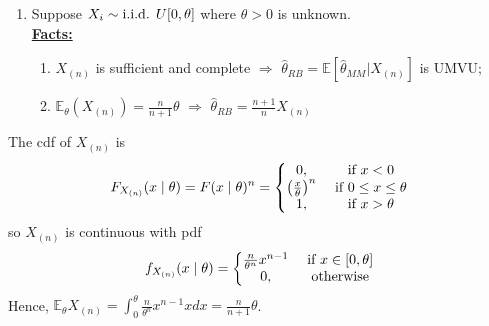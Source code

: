 \documentclass[11pt]{elegantbook}
\begin{document}
\begin{example}\quad
    \begin{enumerate}
        \item Suppose $X_i\sim \textnormal{i.i.d. } U[0,\theta]$ where $\theta>0$ is unknown.\\
        \textbf{\underline{Facts:}}
        \begin{enumerate}[$\bullet$]
            \item $X_{(n)}$ is sufficient and complete $\Rightarrow$
            $\hat{\theta}_{RB}=\mathbb{E}[\hat{\theta}_{MM}|X_{(n)}]$ is UMVU;
            \item $\mathbb{E}_\theta(X_{(n)})=\frac{n}{n+1}\theta$ $\Rightarrow$ $\hat{\theta}_{RB}=\frac{n+1}{n}X_{(n)}$
        \end{enumerate}
    \end{enumerate}
    \begin{remark}
        The cdf of $X_{(n)}$ is
        \begin{equation}
            \begin{aligned}
                F_{X_{(n)}}(x\mid\theta)=F(x\mid\theta)^n=\left\{\begin{matrix}
                    0,&\textnormal{ if }x<0\\
                    \left(\frac{x}{\theta}\right)^n&\textnormal{ if }0\leq x\leq \theta\\
                    1,&\textnormal{ if }x>\theta
                \end{matrix}\right.
            \end{aligned}
            \nonumber
        \end{equation}
        so $X_{(n)}$ is continuous with pdf
        \begin{equation}
            \begin{aligned}
                f_{X_{(n)}}(x\mid\theta)=\left\{\begin{matrix}
                    \frac{n}{\theta^n}x^{n-1}&\textnormal{ if }x\in[0,\theta]\\
                    0,& \textnormal{ otherwise}
                \end{matrix}\right.
            \end{aligned}
            \nonumber
        \end{equation}
        Hence, $\mathbb{E}_\theta X_{(n)}=\int_0^\theta \frac{n}{\theta^n}x^{n-1} x dx = \frac{n}{n+1}\theta$.
    \end{remark}
\end{example}
\end{document}
